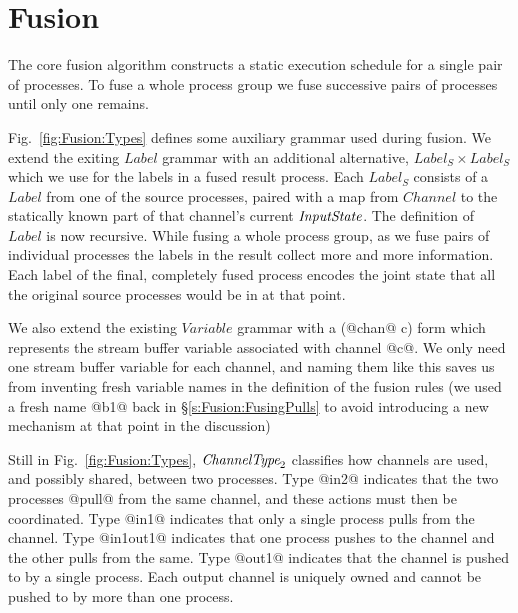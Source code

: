 
\section{Fusion}
\label{s:Fusion}

The core fusion algorithm constructs a static execution schedule for a single pair of processes. To fuse a whole process group we fuse successive pairs of processes until only one remains. 

Fig.~\ref{fig:Fusion:Types} defines some auxiliary grammar used during fusion. We extend the exiting $Label$ grammar with an additional alternative, $Label_S \times Label_S$ which we use for the labels in a fused result process. Each $Label_S$ consists of a $Label$ from one of the  source processes, paired with a map from $Channel$ to the statically known part of that channel's current $\textit{InputState}$. The definition of $Label$ is now recursive. While fusing a whole process group, as we fuse pairs of individual processes the labels in the result collect more and more information. Each label of the final, completely fused process encodes the joint state that all the original source processes would be in at that point.



We also extend the existing $Variable$ grammar with a (@chan@ c) form which represents the stream buffer variable associated with channel @c@. We only need one stream buffer variable for each channel, and naming them like this saves us from inventing fresh variable names in the definition of the fusion rules (we used a fresh name @b1@ back in \S\ref{s:Fusion:FusingPulls} to avoid introducing a new mechanism at that point in the discussion) 

Still in Fig.~\ref{fig:Fusion:Types}, $\textit{ChannelType}_2$ classifies how channels are used, and possibly shared, between two processes. Type @in2@ indicates that the two processes @pull@ from the same channel, and these actions must then be coordinated. Type @in1@ indicates that only a single process pulls from the channel. Type @in1out1@ indicates that one process pushes to the channel and the other pulls from the same. Type @out1@ indicates that the channel is pushed to by a single process. Each output channel is uniquely owned and cannot be pushed to by more than one process.

